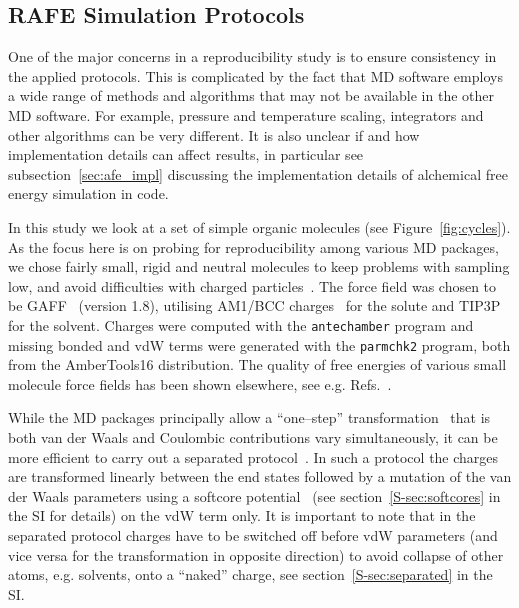 \documentclass[journal=jctcce,manuscript=article]{achemso}
\newcommand{\progname}[1]{\texttt{#1}}
\begin{document}
\subsection{RAFE Simulation Protocols}
\label{sec:rafe_protocols}

One of the major concerns in a reproducibility study is to ensure
consistency in the applied protocols.  This is complicated by the fact
that MD software employs a wide range of methods and algorithms that
may not be available in the other MD software.  For example, pressure and
temperature scaling, integrators and other algorithms can be very
different.  It is also unclear if and how implementation details can
affect results, in particular see subsection~\ref{sec:afe_impl} discussing the 
implementation details of alchemical free energy simulation in code.

In this study we look at a set of simple organic molecules (see
Figure~\ref{fig:cycles}).  As the focus here is on probing for
reproducibility among various MD packages, we chose fairly small,
rigid and neutral molecules to keep problems with sampling low, and
avoid difficulties with charged
particles~\cite{rocklin_calculating_2013, JCC:JCC1050}.  The force
field was chosen to be GAFF~\cite{wang_development_2004} (version
1.8), utilising AM1/BCC charges~\cite{jakalian_fast_2000,
  jakalian_fast_2002} for the solute and
TIP3P~\cite{jorgensen_comparison_1983-1} for the solvent.  Charges were 
computed with the \progname{antechamber} program and missing bonded and vdW 
terms were generated with the \progname{parmchk2} program, both from the 
AmberTools16 distribution.  The quality of free energies of various small 
molecule force fields has been shown
elsewhere, see e.g. Refs.~.

While the MD packages principally allow a ``one--step'' 
transformation~\cite{steinbrecher_soft-core_2011}
that is both van der Waals and Coulombic contributions vary
simultaneously, it can be more efficient to carry out a
separated protocol~\cite{naden_linear_2014, naden_linear_2015}. 
In such a protocol the charges are transformed
linearly between the end states followed by a mutation of the van der
Waals parameters using a softcore
potential~\cite{beutler_avoiding_1994,
  zacharias_separationshifted_1994} (see section~\ref{S-sec:softcores} in the SI for details) on the vdW
term only.  It is important to note that in the separated protocol
charges have to be switched off before vdW parameters (and vice versa
for the transformation in opposite direction) to avoid collapse of
other atoms, e.g. solvents, onto a ``naked'' charge, see 
section~\ref{S-sec:separated} in the SI.
\end{document}
